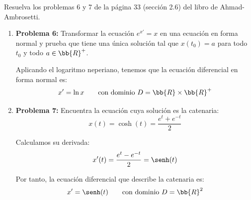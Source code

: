 \begin{ejercicio}
    Resuelva los problemas 6 y 7 de la página 33 (sección 2.6) del libro de Ahmad-Ambrosetti.

    \begin{enumerate}
        \item \textbf{Problema 6:} Transformar la ecuación $e^{x'}=x$ en una ecuación en forma normal y prueba que tiene una única solución tal que $x(t_0)=a$ para todo $t_0$ y todo $a\in \bb{R}^+$.
        
        Aplicando el logaritmo neperiano, tenemos que la ecuación diferencial en forma normal es:
        \begin{equation*}
            x' = \ln x\qquad \text{con dominio } D=\bb{R}\times \bb{R}^+
        \end{equation*}

        
        \item \textbf{Problema 7:} Encuentra la ecuación cuya solución es la catenaria:
        \begin{equation*}
            x(t) = \cosh\left(t\right) = \dfrac{e^t + e^{-t}}{2}
        \end{equation*}

        Calculamos su derivada:
        \begin{equation*}
            x'(t) = \dfrac{e^t - e^{-t}}{2} = \senh(t)
        \end{equation*}

        Por tanto, la ecuación diferencial que describe la catenaria es:
        \begin{equation*}
            x' = \senh(t) \qquad \text{con dominio } D=\bb{R}^2
        \end{equation*}
    \end{enumerate}
\end{ejercicio}

